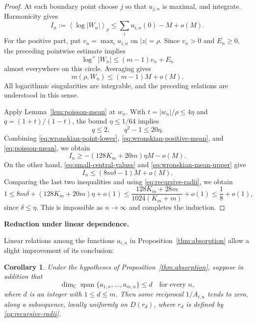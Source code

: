 \documentclass[12pt,letterpaper,reqno]{amsart}
\newtheorem{cor}[thm]{Corollary}
\theoremstyle{definition}
\numberwithin{equation}{section}
\newcommand{\C}{\mathbb C}
\newcommand{\mean}[2]{\left\langle #1\right\rangle_{#2}}
\begin{document}
\begin{proof}
		At each boundary point choose $j$ so that $u_{j,n}$ is maximal, and
		integrate. Harmonicity gives
		\begin{equation}\label{eq:wronskian-mean-upper}
			I_n:=\mean{\log|W_n|}{\rho}
			\le\sum_i u_{i,n}(0)-M+o(M).
		\end{equation}
		For the positive part, put $v_n=\max_i u_{i,n}$ on $|z|=\rho$. Since
		$v_n>0$ and $E_n\ge0$, the preceding pointwise estimate implies
		\begin{equation*}
			\log^+|W_n|\le(m-1)v_n+E_n
		\end{equation*}
		almost everywhere on this circle. Averaging gives
		\begin{equation}\label{eq:wronskian-positive-mean}
			m(\rho,W_n)\le(m-1)M+o(M).
		\end{equation}
		All logarithmic singularities are integrable, and the preceding
		relations are understood in this sense.
		
		Apply Lemma~\ref{lem:poisson-mean} at $w_n$. With
		$t=|w_n|/\rho\le4\eta$ and $q=(1+t)/(1-t)$, the bound
		$\eta\le1/64$ implies
		\begin{equation*}
			q\le2,\qquad q^2-1\le20\eta.
		\end{equation*}
		Combining \eqref{eq:wronskian-point-lower},
		\eqref{eq:wronskian-positive-mean}, and
		\eqref{eq:poisson-mean}, we obtain
		\begin{equation*}
			I_n\ge-(128K_m+20m)\eta M-o(M).
		\end{equation*}
		On the other hand, \eqref{eq:small-central-values} and
		\eqref{eq:wronskian-mean-upper} give
		\begin{equation*}
			I_n\le(8m\delta-1)M+o(M).
		\end{equation*}
		Comparing the last two inequalities and using
		\eqref{eq:recursive-radii}, we obtain
		\[
		1\le 8m\delta+(128K_m+20m)\eta+o(1)
		\le\frac{128K_m+28m}{1024(K_m+m)}+o(1)
		\le\frac18+o(1),
		\]
		since $\delta\le\eta$. This is impossible as $n\to\infty$ and completes
		the induction.
	\end{proof}
	
	
	\medskip\noindent\textbf{Reduction under linear dependence.}
	
Linear relations among the functions $a_{i,n}$ in
Proposition~\ref{thm:absorption} allow a slight improvement of its conclusion:
	
	\begin{cor}\label{cor:rank-adaptive-absorption}
		Under the hypotheses of Proposition~\ref{thm:absorption}, suppose
		in addition that
		\[
		\dim_{\C}\operatorname{span}\{a_{1,n},\ldots,a_{m,n}\}\le d
		\quad\text{for every }n,
		\]
		where $d$ is an integer with $1\le d\le m$. Then some reciprocal $1/A_{i,n}$ tends to zero,
		along a subsequence, locally uniformly on $D(r_d)$, where $r_d$ is defined
		by \eqref{eq:recursive-radii}.
	\end{cor}
	
\end{document}
